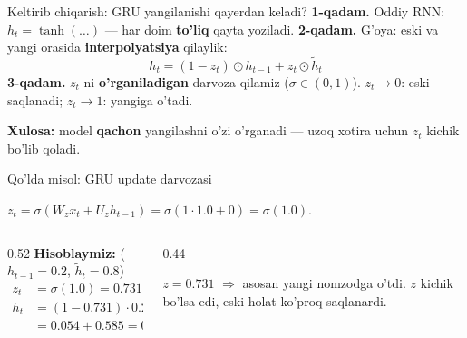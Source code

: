 \documentclass[aspectratio=169,11pt]{beamer}
\begin{document}
\begin{frame}{Keltirib chiqarish: GRU yangilanishi qayerdan keladi?}
  \textbf{1-qadam.} Oddiy RNN: $h_t=\tanh(\ldots)$ --- har doim \textbf{to'liq}
  qayta yoziladi.
  \pause
  \textbf{2-qadam.} G'oya: eski va yangi orasida \textbf{interpolyatsiya} qilaylik:
  $$ h_t = (1-z_t)\odot h_{t-1} + z_t \odot \tilde{h}_t $$
  \pause
  \textbf{3-qadam.} $z_t$ ni \textbf{o'rganiladigan} darvoza qilamiz
  ($\sigma\in(0,1)$). $z_t\to 0$: eski saqlanadi; $z_t\to 1$: yangiga o'tadi.
  \begin{tcolorbox}[okbox,top=2pt,bottom=2pt]
    \small \textbf{Xulosa:} model \textbf{qachon} yangilashni o'zi o'rganadi ---
    uzoq xotira uchun $z_t$ kichik bo'lib qoladi.
  \end{tcolorbox}
\end{frame}

\begin{frame}{Qo'lda misol: GRU update darvozasi}
  \begin{tcolorbox}[defbox,title={1D GRU: $W_z=1$, $U_z=0$, $x_t=1.0$}]
    \small $z_t=\sigma(W_z x_t + U_z h_{t-1})=\sigma(1{\cdot}1.0 + 0)=\sigma(1.0)$.
  \end{tcolorbox}
  \vspace{0.2em}
  \begin{columns}[T]
    \begin{column}{0.52\textwidth}
      \textbf{Hisoblaymiz:} ($h_{t-1}=0.2$, $\tilde{h}_t=0.8$)
      \begin{align*}
        z_t &= \sigma(1.0) = 0.731\\
        h_t &= (1-0.731){\cdot}0.2 + 0.731{\cdot}0.8\\
            &= 0.054 + 0.585 = \mathbf{0.639}
      \end{align*}
    \end{column}
    \begin{column}{0.44\textwidth}
      \begin{tcolorbox}[okbox,top=2pt,bottom=2pt]
        \footnotesize
        $z=0.731$ $\Rightarrow$ asosan yangi nomzodga o'tdi. $z$ kichik bo'lsa edi,
        eski holat ko'proq saqlanardi.
      \end{tcolorbox}
    \end{column}
  \end{columns}
\end{frame}
\end{document}
